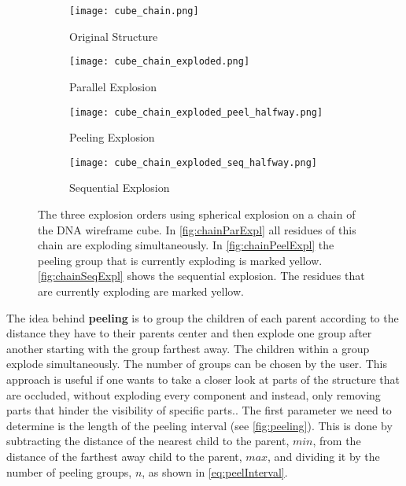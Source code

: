 \documentclass[draft,final]{vutinfth} %
\begin{document}
\begin{figure}
\centering
\begin{subfigure}{0.3\textwidth}
  \centering
  \texttt{[image: cube\_chain.png]}
  \caption{Original Structure}
  \label{fig:chainParExpl}
\end{subfigure}%
\begin{subfigure}{0.3\textwidth}
  \centering
  \texttt{[image: cube\_chain\_exploded.png]}
  \caption{Parallel Explosion}
  \label{fig:chainParExpl}
\end{subfigure}%

\medskip

\begin{subfigure}{0.3\textwidth}
  \centering
  \texttt{[image: cube\_chain\_exploded\_peel\_halfway.png]}
  \caption{Peeling Explosion}
  \label{fig:chainPeelExpl}
\end{subfigure}%
\begin{subfigure}{0.3\textwidth}
  \centering
  \texttt{[image: cube\_chain\_exploded\_seq\_halfway.png]}
  \caption{Sequential Explosion}
  \label{fig:chainSeqExpl}
\end{subfigure}
\caption{The three explosion orders using spherical explosion on a chain of the DNA wireframe cube. In \autoref{fig:chainParExpl} all residues of this chain are exploding simultaneously. In \autoref{fig:chainPeelExpl} the peeling group that is currently exploding is marked yellow. \autoref{fig:chainSeqExpl} shows the sequential explosion. The residues that are currently exploding are marked yellow.}
\label{fig:explOrders}
\end{figure}

\par The idea behind \textbf{peeling} is to group the children of each parent according to the distance they have to their parents center and then explode one group after another starting with the group farthest away. The children within a group explode simultaneously. The number of groups can be chosen by the user. This approach is useful if one wants to take a closer look at parts of the structure that are occluded, without exploding every component and instead, only removing parts that hinder the visibility of specific parts.. The first parameter we need to determine is the length of the peeling interval (see \autoref{fig:peeling}). This is done by subtracting the distance of the nearest child to the parent, \(min\), from the distance of the farthest away child to the parent, \(max\), and dividing it by the number of peeling groups, \(n\), as shown in \autoref{eq:peelInterval}.
\end{document}
